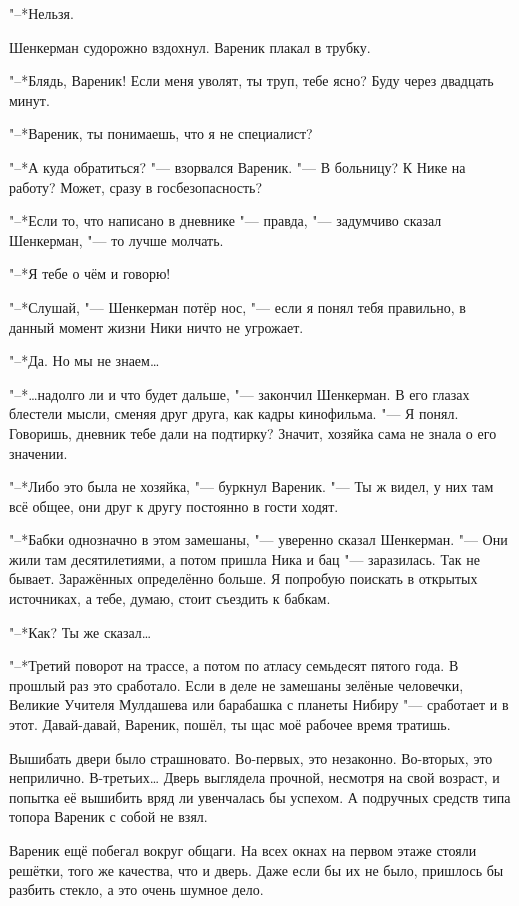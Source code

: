 "--*Нельзя.

Шенкерман судорожно вздохнул.
Вареник плакал в трубку.

"--*Блядь, Вареник!
Если меня уволят, ты труп, тебе ясно?
Буду через двадцать минут.

\asterism

"--*Вареник, ты понимаешь, что я не специалист?

"--*А куда обратиться? "--- взорвался Вареник.
"--- В больницу?
К Нике на работу?
Может, сразу в госбезопасность?

"--*Если то, что написано в дневнике "--- правда, "--- задумчиво сказал Шенкерман, "--- то лучше молчать.

"--*Я тебе о чём и говорю!

"--*Слушай, "--- Шенкерман потёр нос, "--- если я понял тебя правильно, в данный момент жизни Ники ничто не угрожает.

"--*Да.
Но мы не знаем\ldots{}

"--*\ldots{}надолго ли и что будет дальше, "--- закончил Шенкерман.
В его глазах блестели мысли, сменяя друг друга, как кадры кинофильма.
"--- Я понял.
Говоришь, дневник тебе дали на подтирку?
Значит, хозяйка сама не знала о его значении.

"--*Либо это была не хозяйка, "--- буркнул Вареник.
"--- Ты ж видел, у них там всё общее, они друг к другу постоянно в гости ходят.

"--*Бабки однозначно в этом замешаны, "--- уверенно сказал Шенкерман.
"--- Они жили там десятилетиями, а потом пришла Ника и бац "--- заразилась.
Так не бывает.
Заражённых определённо больше.
Я попробую поискать в открытых источниках, а тебе, думаю, стоит съездить к бабкам.

"--*Как?
Ты же сказал\ldots{}

"--*Третий поворот на трассе, а потом по атласу семьдесят пятого года.
В прошлый раз это сработало.
Если в деле не замешаны зелёные человечки, Великие Учителя Мулдашева или барабашка с планеты Нибиру "--- сработает и в этот.
Давай-давай, Вареник, пошёл, ты щас моё рабочее время тратишь.

\asterism

\textspace

Вышибать двери было страшновато.
Во-первых, это незаконно.
Во-вторых, это неприлично.
В-третьих\ldots{}
Дверь выглядела прочной, несмотря на свой возраст, и попытка её вышибить вряд ли увенчалась бы успехом.
А подручных средств типа топора Вареник с собой не взял.

Вареник ещё побегал вокруг общаги.
На всех окнах на первом этаже стояли решётки, того же качества, что и дверь.
Даже если бы их не было, пришлось бы разбить стекло, а это очень шумное дело.

